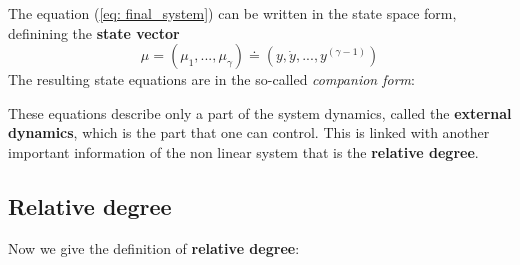 The equation (\ref{eq: final_system}) can be written in the state space form, definining the \textbf{state vector}
\begin{equation}
    \mu=(\mu_1,...,\mu_\gamma)\doteq(y, \dot{y},...,y^{(\gamma-1)})
\end{equation}
The resulting state equations are in the so-called \textit{companion form}: \\

\hspace*{-5mm}
%


These equations describe only a part of the system dynamics, called the {\textbf{external dynamics}}, which is the part that one can control. This is linked with another important information of the non linear system that is the \textbf{relative degree}.

\subsection{Relative degree}
Now we give the definition of \textbf{relative degree}:\\

\hspace*{-5mm}
% 
\\

